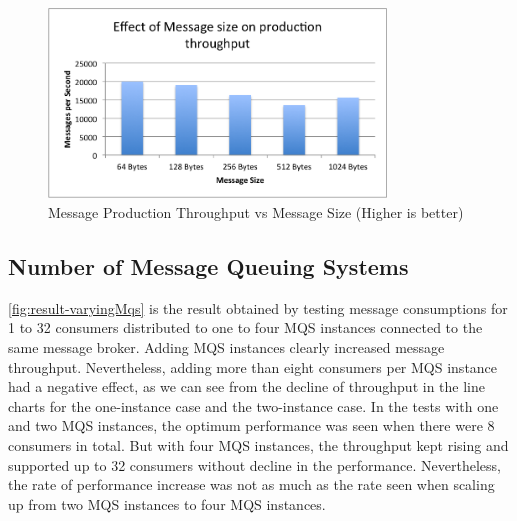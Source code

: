 \begin{figure}[H]
  \centering  \includegraphics[width=0.8\textwidth]{figures/03productionMessageSize}
  \caption[Message Production Throughput vs Message Size]{Message Production Throughput vs Message Size (Higher is better)}
  \label{fig:result-productionMessageSize}
\end{figure}

\subsection{Number of Message Queuing Systems}
  \autoref{fig:result-varyingMqs} is the result obtained by testing message consumptions for 1 to 32 consumers distributed to one to four MQS instances connected to the same message broker. Adding MQS instances clearly increased message throughput. Nevertheless, adding more than eight consumers per MQS instance had a negative effect, as we can see from the decline of throughput in the line charts for the one-instance case and the two-instance case. In the tests with one and two MQS instances, the optimum performance was seen when there were 8 consumers in total. But with four MQS instances, the throughput kept rising and supported up to 32 consumers without decline in the performance. Nevertheless, the rate of performance increase was not as much as the rate seen when scaling up from two MQS instances to four MQS instances.

